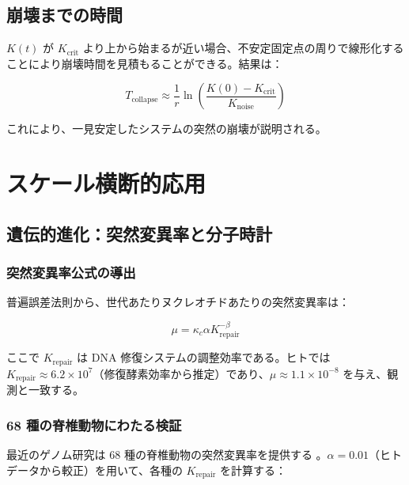 \documentclass[12pt,a4paper]{article}
\newcommand{\Keffcrit}{K_{\mathrm{crit}}}
\newcommand{\kappac}{\kappa_c}
\theoremstyle{remark}
\begin{document}
	\subsection{崩壊までの時間}
	
	\(K(t)\) が \(\Keffcrit\) より上から始まるが近い場合、不安定固定点の周りで線形化することにより崩壊時間を見積もることができる。結果は：
	
	\begin{equation}
		T_{\text{collapse}} \approx \frac{1}{r} \ln\left( \frac{K(0) - \Keffcrit}{K_{\text{noise}}} \right)
		\label{eq:collapse-time}
	\end{equation}
	
	これにより、一見安定したシステムの突然の崩壊が説明される。
	
	\section{スケール横断的応用}
	\label{sec:applications}
	
	\subsection{遺伝的進化：突然変異率と分子時計}
	\label{subsec:genetic}
	
	\subsubsection{突然変異率公式の導出}
	
	普遍誤差法則から、世代あたりヌクレオチドあたりの突然変異率は：
	
	\begin{equation}
		\mu = \kappac \alpha K_{\text{repair}}^{-\beta}
		\label{eq:mutation-rate}
	\end{equation}
	
	ここで \(K_{\text{repair}}\) は DNA 修復システムの調整効率である。ヒトでは \(K_{\text{repair}} \approx 6.2 \times 10^7\)（修復酵素効率から推定）であり、\(\mu \approx 1.1 \times 10^{-8}\) を与え、観測と一致する。
	
	\subsubsection{68 種の脊椎動物にわたる検証}
	
	最近のゲノム研究は 68 種の脊椎動物の突然変異率を提供する \cite{Bergeron2023}。\(\alpha = 0.01\)（ヒトデータから較正）を用いて、各種の \(K_{\text{repair}}\) を計算する：
	
\end{document}
